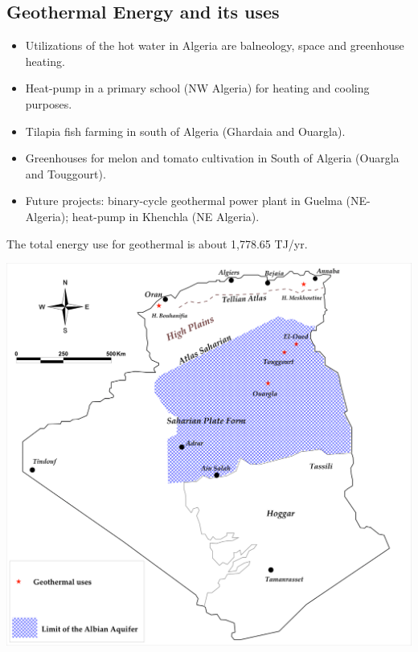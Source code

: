 \documentclass[a0,portrait]{a0poster}
\begin{document}
\begin{multicols}{3}
\subsection*{Geothermal Energy and its uses}
\begin{itemize}
\item Utilizations of the hot water in Algeria are balneology, space and greenhouse heating. 
\item Heat-pump in a primary school (NW Algeria) for heating and cooling purposes.
\item Tilapia fish farming in south of Algeria (Ghardaia and Ouargla).
\item Greenhouses for melon and tomato cultivation in South of Algeria (Ouargla and Touggourt).
\item Future projects: binary-cycle geothermal power plant in Guelma (NE-Algeria); heat-pump in Khenchla (NE Algeria).
\end{itemize}
The total energy use for geothermal is about 1,778.65 TJ/yr.

\begin{center}\vspace{1cm}
\includegraphics[width=0.8\linewidth]{Figure_7}
\end{center}\vspace{1cm}


\end{multicols}
\end{document}
